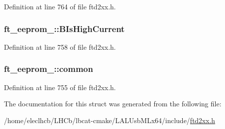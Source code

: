 Definition at line 764 of file ftd2xx.h.\hypertarget{structft__eeprom__2232_a2d7b4af1ab0e3b0084e13b83f513b5d5}{
\subsubsection[{BIsHighCurrent}]{ {\bf ft\_\-eeprom\_::BIsHighCurrent}}}
\label{structft__eeprom__2232_a2d7b4af1ab0e3b0084e13b83f513b5d5}


Definition at line 758 of file ftd2xx.h.\hypertarget{structft__eeprom__2232_a6b294dc09899eb022f2e949b3d5c4972}{
\subsubsection[{common}]{ {\bf ft\_\-eeprom\_::common}}}
\label{structft__eeprom__2232_a6b294dc09899eb022f2e949b3d5c4972}


Definition at line 755 of file ftd2xx.h.

The documentation for this struct was generated from the following file:\begin{DoxyCompactItemize}
\item 
/home/eleclhcb/LHCb/lbcat-\/cmake/LALUsbMLx64/include/\hyperlink{LALUsbMLx64_2include_2ftd2xx_8h}{ftd2xx.h}\end{DoxyCompactItemize}
